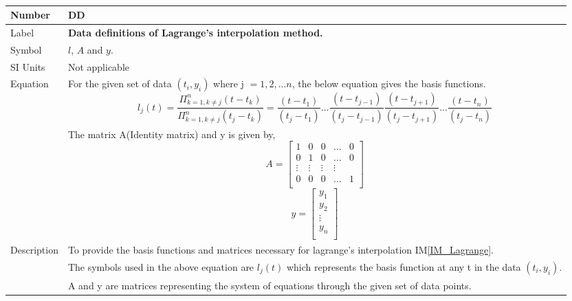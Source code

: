 \documentclass[12pt]{article}
\newcommand{\colAwidth}{0.13\textwidth}
\newcommand{\colBwidth}{0.82\textwidth}
\newcounter{defnum} %
\newcounter{datadefnum} %
\newcommand{\iref}[1]{IM\ref{#1}}
\begin{document}
~\newline

\noindent
\begin{minipage}{\textwidth}
	\renewcommand*{\arraystretch}{1.5}
	\begin{tabular}{| p{\colAwidth} | p{\colBwidth}|}
		\hline
		\rowcolor[gray]{0.9}
		Number
		& DD{datadefnum}\thedatadefnum \label{DD_Lagrange}\\
		\hline
		
		Label
		& \bf Data definitions of Lagrange's interpolation method.\\
		\hline
		
		Symbol 
		&$l$, $A$ and $y$.\\
		\hline
		
		SI Units 
		& Not applicable\\
		\hline
		
		Equation
		&For the given set of data $(t_i, y_i)$ where j $= {1,2,...n}$, the below equation gives the basis functions.
		\begin{equation*}
		l_j (t) =  \frac{ \Pi _{k=1, k\neq j} ^n (t - t_k)} {\Pi _{k=1,k \neq j} ^ n (t_j - t_k)} = \frac{(t - t_1)}{(t_j - t_1)}...\frac{(t - t_{j-1})}{(t_j - t_{j-1})}\frac{(t - t_{j+1})}{(t_j - t_{j+1})}... \frac{(t - t_n)}{(t_j - t_n)}
		\end{equation*}
		\\
		&The matrix A(Identity matrix) and y is given by,
		\begin{equation*}
		A = \begin{bmatrix}
		1 & 0 & 0 & \dots & 0 \\
		0 & 1 & 0 & \dots & 0 \\
		\vdots & \vdots & \vdots & \vdots \\
		0 & 0 & 0 & \dots & 1 \\
		\end{bmatrix}
		\end{equation*}
		\begin{equation*}
		y = \begin{bmatrix}
		y_1  \\
		y_2 \\
		\vdots \\
		y_n \\
		\end{bmatrix}
		\end{equation*} \\
		\hline
Description 
&To provide the basis functions and matrices necessary for lagrange's interpolation \iref{IM_Lagrange}.\\
& The symbols used in the above equation are $l_j(t)$ which represents the basis function at any t in the data $(t_i, y_i)$.\\
&A and y are matrices representing the system of equations through the given set of data points.\\
\hline


\end{tabular}
\end{minipage}
\end{document}
